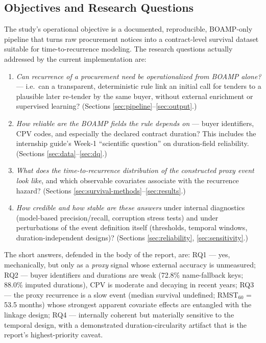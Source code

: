 \documentclass[11pt]{article}
\begin{document}
\subsection{Objectives and Research Questions}
\label{sec:rq}
The study's operational objective is a documented, reproducible,
BOAMP-only pipeline that turns raw procurement notices into a
contract-level survival dataset suitable for time-to-recurrence modeling.
The research questions actually addressed by the current implementation
are:
\begin{enumerate}
  \item[\textbf{RQ1.}] \emph{Can recurrence of a procurement need be
  operationalized from BOAMP alone?} --- i.e.\ can a transparent,
  deterministic rule link an initial call for tenders to a plausible later
  re-tender by the same buyer, without external enrichment or supervised
  learning? (Sections \ref{sec:pipeline}--\ref{sec:output}.)
  \item[\textbf{RQ2.}] \emph{How reliable are the BOAMP fields the rule
  depends on} --- buyer identifiers, CPV codes, and especially the declared
  contract duration? This includes the internship guide's Week-1
  ``scientific question'' on duration-field reliability.
  (Sections \ref{sec:data}--\ref{sec:dq}.)
  \item[\textbf{RQ3.}] \emph{What does the time-to-recurrence distribution
  of the constructed proxy event look like}, and which observable covariates
  associate with the recurrence hazard? (Sections
  \ref{sec:survival-methods}--\ref{sec:results}.)
  \item[\textbf{RQ4.}] \emph{How credible and how stable are these
  answers} under internal diagnostics (model-based precision/recall,
  corruption stress tests) and under perturbations of the event definition
  itself (thresholds, temporal windows, duration-independent designs)?
  (Sections \ref{sec:reliability}, \ref{sec:sensitivity}.)
\end{enumerate}
The short answers, defended in the body of the report, are: RQ1 --- yes,
mechanically, but only as a \emph{proxy} signal whose external accuracy is
unmeasured; RQ2 --- buyer identifiers and durations are weak (72.8\%
name-fallback keys; 88.0\% imputed durations), CPV is moderate and decaying
in recent years; RQ3 --- the proxy recurrence is a slow event (median
survival undefined; RMST$_{60}$ = 53.5 months) whose strongest apparent
covariate effects are entangled with the linkage design; RQ4 --- internally
coherent but materially sensitive to the temporal design, with a
demonstrated duration-circularity artifact that is the report's
highest-priority caveat.
\end{document}
